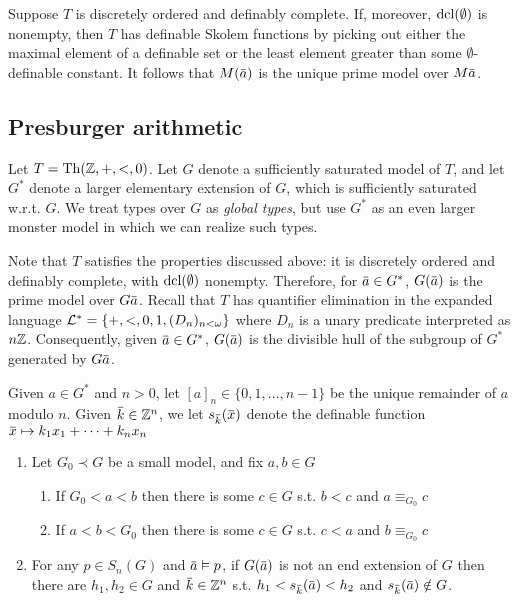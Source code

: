 \documentclass[11pt]{article}
\begin{document}
Suppose \(T\) is discretely ordered and definably complete. If, moreover, \(\operatorname{dcl}(\emptyset)\) is
nonempty, then \(T\) has definable Skolem functions by picking out either the maximal element of
a definable set or the least element greater than some \(\emptyset\)-definable constant. It follows
that \(M(\bara)\) is the unique prime model over \(M\bara\). \label{Problem3}
\subsection{Presburger arithmetic}
\label{sec:org4923376}
Let \(T=\operatorname{Th}(\mathbb{Z},+,<,0)\). Let \(G\) denote a sufficiently saturated model of \(T\), and
let \(G^*\) denote a larger elementary extension of \(G\), which is sufficiently saturated
w.r.t. \(G\). We treat types over \(G\) as \emph{global types}, but use \(G^*\) as an even larger
monster model in which we can realize such types.

Note that \(T\) satisfies the properties discussed above: it is discretely ordered and definably
complete, with \(\operatorname{dcl}(\emptyset)\) nonempty. Therefore, for \(\bara\in G^*\), \(G(\bara)\) is the prime
model over \(G\bara\). Recall that \(T\) has quantifier elimination in the expanded language
\(\mathcal{L}^*=\{+,<,0,1,(D_n)_{n<\omega}\}\) where \(D_n\) is a unary predicate interpreted as \(n\mathbb{Z}\).
Consequently, given \(\bara\in G^*\), \(G(\bara)\) is the divisible hull of the subgroup
of \(G^*\) generated by \(G\bara\).  \label{Problem4}

Given \(a\in G^*\) and \(n>0\), let \([a]_n\in\{0,1,\dots,n-1\}\) be the unique remainder of \(a\)
modulo \(n\). Given \(\bark\in\Z^n\), we let \(s_{\bark}(\barx)\) denote the definable function
\(\barx\mapsto k_1x_1+\dots+k_nx_n\)

\begin{proposition}[]
\label{0.4}
\begin{enumerate}
\item Let \(G_0\prec G\) be a small model, and fix \(a,b\in G\)
\begin{enumerate}
\item If \(G_0<a<b\) then there is some \(c\in G\) s.t. \(b<c\) and \(a\equiv_{G_0}c\)
\item If \(a<b<G_0\) then there is some \(c\in G\) s.t. \(c<a\) and \(b\equiv_{G_0}c\)
\end{enumerate}
\item For any \(p\in S_n(G)\) and \(\bara\vDash p\), if \(G(\bara)\) is not an end extension of \(G\) then
there are \(h_1,h_2\in G\) and \(\bark\in\Z^n\) s.t. \(h_1<s_{\bark}(\bara)<h_2\)
and \(s_{\bark}(\bara)\notin G\).
\end{enumerate}
\end{proposition}
\end{document}
